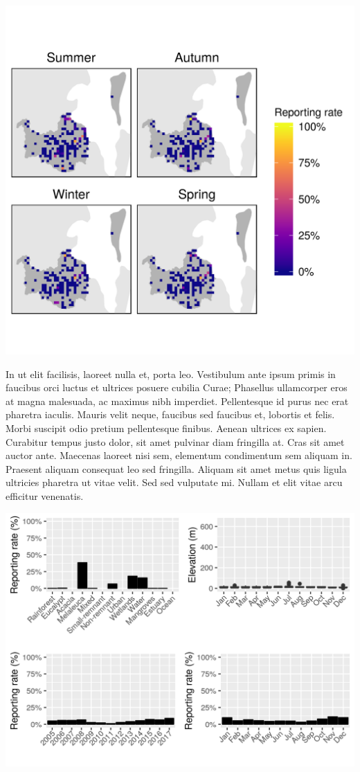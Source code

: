 \documentclass[12pt,openany,oneside]{book}
\theoremstyle{definition}
\theoremstyle{definition}
\theoremstyle{definition}
\theoremstyle{remark}
\begin{document}
\includegraphics{assets/maps/Anseranas-semipalmata.png}

In ut elit facilisis, laoreet nulla et, porta leo. Vestibulum ante ipsum
primis in faucibus orci luctus et ultrices posuere cubilia Curae;
Phasellus ullamcorper eros at magna malesuada, ac maximus nibh
imperdiet. Pellentesque id purus nec erat pharetra iaculis. Mauris velit
neque, faucibus sed faucibus et, lobortis et felis. Morbi suscipit odio
pretium pellentesque finibus. Aenean ultrices ex sapien. Curabitur
tempus justo dolor, sit amet pulvinar diam fringilla at. Cras sit amet
auctor ante. Maecenas laoreet nisi sem, elementum condimentum sem
aliquam in. Praesent aliquam consequat leo sed fringilla. Aliquam sit
amet metus quis ligula ultricies pharetra ut vitae velit. Sed sed
vulputate mi. Nullam et elit vitae arcu efficitur venenatis.

\includegraphics{assets/graphs/Anseranas-semipalmata.png}
\end{document}
